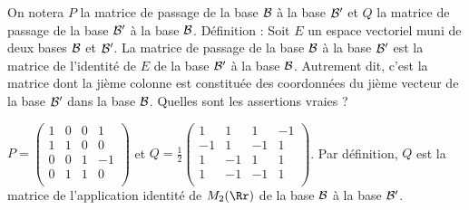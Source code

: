 {\begin{question}
On notera $P$ la matrice de passage de la base ${\cal {B}}$ à la base ${\cal {B'}}$ et $Q$ la matrice de passage de la base ${\cal {B'}}$ à la base ${\cal {B}}$.
\vskip1mm
Définition : Soit $E$ un espace vectoriel muni de deux bases ${\cal {B}}$ et ${\cal {B}}'$. La matrice de passage de la base ${\cal {B}}$ à la base  ${\cal {B}}'$ est la matrice de l'identité de $E$ de la base ${\cal {B}}'$ à la base  ${\cal {B}}$. Autrement dit, c'est la matrice dont la jième colonne est constituée des coordonnées du jième vecteur de la base ${\cal {B}'}$ dans la base  ${\cal {B}}$.
\vskip1mm
Quelles sont les assertions vraies ?
\begin{answers}
\end{answers}
\vskip2mm
\begin{explanations} $P = \left(\begin{array}{rccc}
1&0&0&1\\
1&1&0&0\\
0&0&1&-1\\
0&1&1&0\\
\end{array}\right)$ et
$\displaystyle Q= \frac{1}{2}\left(\begin{array}{rccc}
1&1&1&-1\\
-1&1&-1&1\\
1&-1&1&1\\
1&-1&-1&1\\
\end{array}\right)$. Par définition, $Q$ est la matrice de l'application identité de $M_2(\Rr)$ de la base ${\cal {B}}$ à la base ${\cal {B'}}$.
\end{explanations}
\end{question}
}
